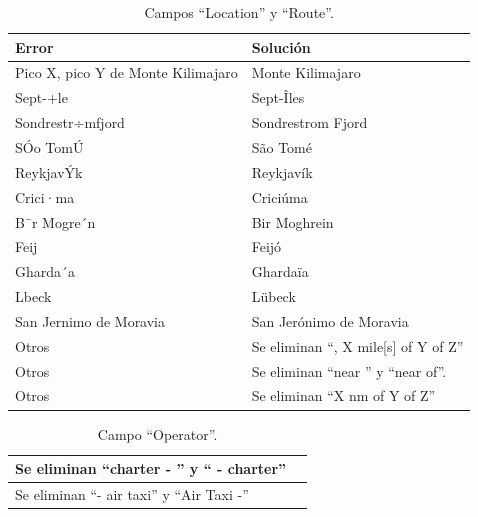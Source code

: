 \documentclass[a4paper,10pt]{article}
\begin{document}
\singlespacing
\begin{table}[htbp]
\centering
\begin{tabular}{p{5cm} p{7cm}}
\hline \hline
Error& Soluci\'on \\
\hline \hline
Pico X, pico Y de Monte Kilimajaro &Monte Kilimajaro\\
\hline
Sept-+le& Sept-\^Iles\\
\hline
Sondrestr÷mfjord& Sondrestrom Fjord\\
\hline
S\'Oo Tom\'U& S\~ao Tom\'e\\
\hline
Reykjav\'Yk& Reykjav\'ik\\
\hline
Crici·ma& Crici\'uma\\
\hline
B¯r Mogre´n& Bir Moghrein\\
\hline
Feij& Feij\'o\\
\hline
Gharda´a& Gharda\"ia\\
\hline
Lbeck&  L\"ubeck\\
\hline
San Jernimo de Moravia& San Jer\'onimo de Moravia\\
\hline \hline
Otros& Se eliminan ``, X mile[s] of Y of Z'' \\
\hline
Otros& Se eliminan ``near '' y ``near of''. \\
\hline
Otros& Se eliminan ``X nm of Y of Z''\\
\hline \hline

\end{tabular}
\caption{Campos ``Location'' y ``Route''.}
\label{tabla:autores}
\end{table}

\begin{table}[htbp]
\centering
\begin{tabular}{p{2cm} p{10cm}}
\hline \hline
Se eliminan ``charter - '' y `` - charter''&\\
\hline
Se eliminan ``- air taxi'' y ``Air Taxi -''&\\
\hline \hline

\end{tabular}
\caption{Campo ``Operator''.}
\label{tabla:autores}
\end{table}
\end{document}
